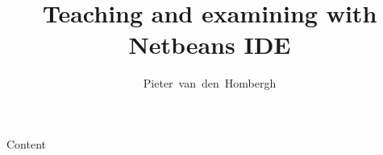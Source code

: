\documentclass{beamer}
\author[HOM]{Pieter~van~den~Hombergh}
\title{Teaching and \textbf{examining} with Netbeans IDE}
\begin{document}
\frame{\titlepage}
\begin{frame}{Content}
  \tableofcontents
\end{frame}

\end{document}
